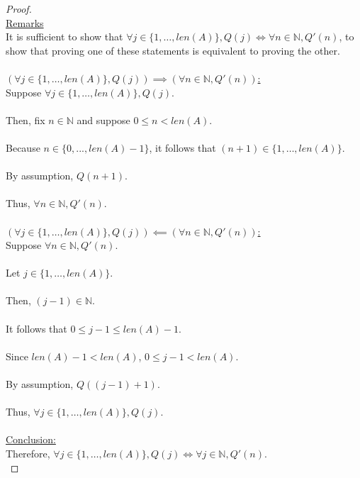 \documentclass[12pt]{article}
\begin{document}
\begin{proof}
\leavevmode\\
    \underline{Remarks} \\
    It is sufficient to show that $\forall j \in \{ 1, \dots, len(A) \}, Q(j) \iff \forall n \in \mathbb{N}, Q'(n)$, to show that proving one of these statements is equivalent to proving the other. \\
    \\
    \underline{$(\forall j \in \{ 1, \dots, len(A) \}, Q(j)) \implies (\forall n \in \mathbb{N}, Q'(n))$:} \\
    Suppose $\forall j \in \{ 1, \dots, len(A) \}, Q(j)$. \\
    \\
    Then, fix $n \in \mathbb{N}$ and suppose $0 \leq n <  len(A)$. \\
    \\
    Because $n \in \{0, ..., len(A) - 1\}$, it follows that $(n + 1) \in \{ 1, \dots, len(A) \} $. \\
    \\
    By assumption, $Q(n + 1)$. \\
    \\
    Thus, $\forall n \in \mathbb{N}, Q'(n)$. \\
    \\
    \underline{$(\forall j \in \{ 1, \dots, len(A) \}, Q(j)) \impliedby (\forall n \in \mathbb{N}, Q'(n))$:} \\
    Suppose $\forall n \in \mathbb{N}, Q'(n)$. \\
    \\
    Let $j \in \{ 1, \dots, len(A) \}$. \\
    \\
    Then, $(j - 1) \in \mathbb{N}$. \\
    \\
    It follows that $0 \leq j - 1 \leq len(A) - 1$. \\
    \\
    Since $len(A) - 1 < len(A)$, $0 \leq j - 1 < len(A)$. \\
    \\
    By assumption, $Q((j - 1) + 1)$. \\
    \\
    Thus, $\forall j \in \{1, \dots, len(A)\}, Q(j)$. \\
    \\
    \underline{Conclusion:} \\
    Therefore, $\forall j \in \{ 1, \dots, len(A) \}, Q(j) \iff \forall j \in \mathbb{N}, Q'(n)$. \\
\end{proof}
\pagebreak
\end{document}
